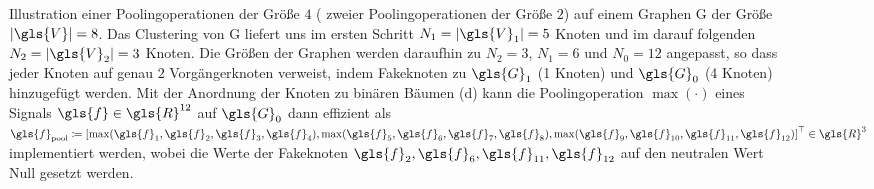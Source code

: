 \begin{figure}[t]
{
}
\caption[Pooling auf Graphen]{Illustration einer Poolingoperationen der Größe $4$ (\bzw{} zweier Poolingoperationen der Größe $2$) auf einem Graphen \gls{G} der Größe $\left|\gls{V}\right| = 8$.
Das Clustering von \gls{G} liefert uns im ersten Schritt $N_1 =\left|\gls{V}_1\right| = 5$ Knoten und im darauf folgenden $N_2 = \left|\gls{V}_2\right| = 3$ Knoten.
Die Größen der Graphen werden daraufhin zu $N_2 = 3$, $N_1 = 6$ und $N_0 = 12$ angepasst, so dass jeder Knoten auf genau $2$ Vorgängerknoten verweist, indem Fakeknoten zu $\gls{G}_1$ (1 Knoten) und $\gls{G}_0$ (4 Knoten) hinzugefügt werden.
Mit der Anordnung der Knoten zu binären Bäumen (d) kann die Poolingoperation $\max\left(\cdot\right)$ eines Signals $\gls{f} \in \gls{R}^{12}$ auf $\gls{G}_0$ dann effizient als $\gls{f}_{\mathrm{pool}} \coloneqq {\left[ \max\left(\gls{f}_1, \gls{f}_2, \gls{f}_3, \gls{f}_4 \right), \max\left(\gls{f}_5, \gls{f}_6, \gls{f}_7, \gls{f}_8 \right), \max\left(\gls{f}_9, \gls{f}_{10}, \gls{f}_{11}, \gls{f}_{12} \right) \right]}^{\top} \in \gls{R}^3$ implementiert werden, wobei die Werte der Fakeknoten $\gls{f}_2, \gls{f}_6, \gls{f}_{11}, \gls{f}_{12}$ auf den neutralen Wert Null gesetzt werden.}
\label{fig:pooling}
\end{figure}
